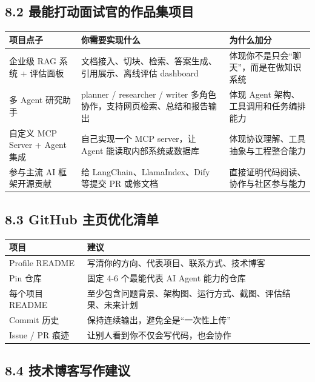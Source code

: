 \subsection{8.2 最能打动面试官的作品集项目}

\begingroup
\scriptsize
\setlength{\tabcolsep}{3pt}
\begin{longtable}{|p{}|p{}|p{}|}
\hline
项目点子 & 你需要实现什么 & 为什么加分 \\ \hline
企业级 RAG 系统 + 评估面板 & 文档接入、切块、检索、答案生成、引用展示、离线评估 dashboard & 体现你不是只会``聊天''，而是在做知识系统 \\ \hline
多 Agent 研究助手 & planner / researcher / writer 多角色协作，支持网页检索、总结和报告输出 & 体现 Agent 架构、工具调用和任务编排能力 \\ \hline
自定义 MCP Server + Agent 集成 & 自己实现一个 MCP server，让 Agent 能读取内部系统或数据库 & 体现协议理解、工具抽象与工程整合能力 \\ \hline
参与主流 AI 框架开源贡献 & 给 LangChain、LlamaIndex、Dify 等提交 PR 或修文档 & 直接证明代码阅读、协作与社区参与能力 \\ \hline
\end{longtable}
\endgroup

\subsection{8.3 GitHub 主页优化清单}

\begingroup
\scriptsize
\setlength{\tabcolsep}{3pt}
\begin{longtable}{|p{}|p{}|}
\hline
项目 & 建议 \\ \hline
Profile README & 写清你的方向、代表项目、联系方式、技术博客 \\ \hline
Pin 仓库 & 固定 4-6 个最能代表 AI Agent 能力的仓库 \\ \hline
每个项目 README & 至少包含问题背景、架构图、运行方式、截图、评估结果、未来计划 \\ \hline
Commit 历史 & 保持连续输出，避免全是``一次性上传'' \\ \hline
Issue / PR 痕迹 & 让别人看到你不仅会写代码，也会协作 \\ \hline
\end{longtable}
\endgroup

\subsection{8.4 技术博客写作建议}

